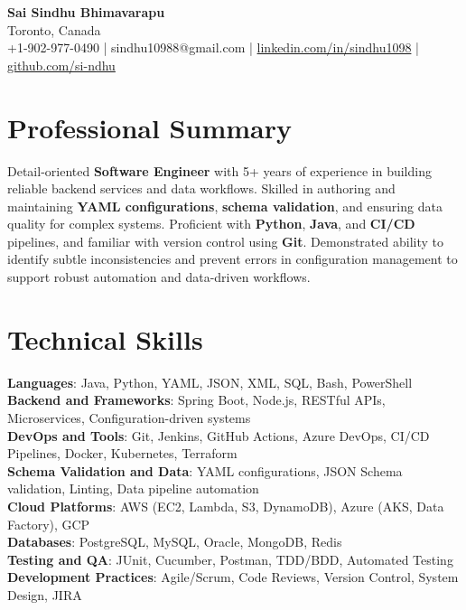 \documentclass[letterpaper,11pt]{article}
\begin{document}
\begin{center}
  {\Large \textbf{Sai Sindhu Bhimavarapu}} \\
  Toronto, Canada \\
  +1-902-977-0490 \enspace | \enspace sindhu10988@gmail.com \enspace | \enspace \href{https://www.linkedin.com/in/sindhu1098/}{linkedin.com/in/sindhu1098} \enspace | \enspace \href{https://github.com/si-ndhu}{github.com/si-ndhu}
\end{center}

\section{Professional Summary}
  \begin{itemize}[leftmargin=0.15in, label={}]
    \small{\item{
     Detail-oriented \textbf{Software Engineer} with 5+ years of experience in building reliable backend services and data workflows. Skilled in authoring and maintaining \textbf{YAML configurations}, \textbf{schema validation}, and ensuring data quality for complex systems. Proficient with \textbf{Python}, \textbf{Java}, and \textbf{CI/CD} pipelines, and familiar with version control using \textbf{Git}. Demonstrated ability to identify subtle inconsistencies and prevent errors in configuration management to support robust automation and data-driven workflows.
    }}
  \end{itemize}
\vspace{-16pt}

\section{Technical Skills}
 \begin{itemize}[leftmargin=0.15in, label={}]
    \small{\item{
     \textbf{Languages}: Java, Python, YAML, JSON, XML, SQL, Bash, PowerShell \\
     \textbf{Backend and Frameworks}: Spring Boot, Node.js, RESTful APIs, Microservices, Configuration-driven systems \\
     \textbf{DevOps and Tools}: Git, Jenkins, GitHub Actions, Azure DevOps, CI/CD Pipelines, Docker, Kubernetes, Terraform \\
     \textbf{Schema Validation and Data}: YAML configurations, JSON Schema validation, Linting, Data pipeline automation \\
     \textbf{Cloud Platforms}: AWS (EC2, Lambda, S3, DynamoDB), Azure (AKS, Data Factory), GCP \\
     \textbf{Databases}: PostgreSQL, MySQL, Oracle, MongoDB, Redis \\
     \textbf{Testing and QA}: JUnit, Cucumber, Postman, TDD/BDD, Automated Testing \\
     \textbf{Development Practices}: Agile/Scrum, Code Reviews, Version Control, System Design, JIRA
    }}
 \end{itemize}
\vspace{-16pt}
\end{document}
